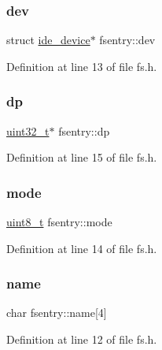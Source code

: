 \subsubsection{\texorpdfstring{dev}{dev}}
{\footnotesize\ttfamily struct \hyperlink{a00224}{ide\+\_\+device}$\ast$ fsentry\+::dev}



Definition at line 13 of file fs.\+h.

\mbox{\label{a00272_ae1d22893563b8753e29fef01f0782ba5_ae1d22893563b8753e29fef01f0782ba5}} 
\subsubsection{\texorpdfstring{dp}{dp}}
{\footnotesize\ttfamily \hyperlink{a00140_a435d1572bf3f880d55459d9805097f62_a435d1572bf3f880d55459d9805097f62}{uint32\+\_\+t}$\ast$ fsentry\+::dp}



Definition at line 15 of file fs.\+h.

\mbox{\label{a00272_a6e71712bc3c51c21dc3362334937e4d7_a6e71712bc3c51c21dc3362334937e4d7}} 
\subsubsection{\texorpdfstring{mode}{mode}}
{\footnotesize\ttfamily \hyperlink{a00140_aba7bc1797add20fe3efdf37ced1182c5_aba7bc1797add20fe3efdf37ced1182c5}{uint8\+\_\+t} fsentry\+::mode}



Definition at line 14 of file fs.\+h.

\mbox{\label{a00272_a9c5a4f5b02eb2c9e9e797f79dc99028a_a9c5a4f5b02eb2c9e9e797f79dc99028a}} 
\subsubsection{\texorpdfstring{name}{name}}
{\footnotesize\ttfamily char fsentry\+::name\mbox{[}4\mbox{]}}



Definition at line 12 of file fs.\+h.

